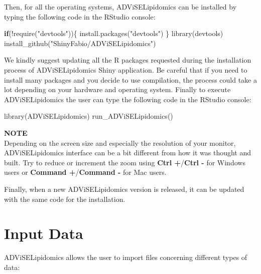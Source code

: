 \documentclass[
]{book}
\newenvironment{Shaded}{\begin{snugshade}}{\end{snugshade}}
\newcommand{\ControlFlowTok}[1]{\textcolor[rgb]{0.13,0.29,0.53}{\textbf{#1}}}
\newcommand{\FunctionTok}[1]{\textcolor[rgb]{0.00,0.00,0.00}{#1}}
\newcommand{\NormalTok}[1]{#1}
\newcommand{\SpecialCharTok}[1]{\textcolor[rgb]{0.00,0.00,0.00}{#1}}
\newcommand{\StringTok}[1]{\textcolor[rgb]{0.31,0.60,0.02}{#1}}
\begin{document}
Then, for all the operating systems, ADViSELipidomics can be installed by typing the following code in the RStudio console:

\begin{Shaded}
\begin{Highlighting}[]
\ControlFlowTok{if}\NormalTok{(}\SpecialCharTok{!}\FunctionTok{require}\NormalTok{(}\StringTok{"devtools"}\NormalTok{))\{}
  \FunctionTok{install.packages}\NormalTok{(}\StringTok{"devtools"}\NormalTok{)}
\NormalTok{\}}
\FunctionTok{library}\NormalTok{(devtools)}
\FunctionTok{install\_github}\NormalTok{(}\StringTok{"ShinyFabio/ADViSELipidomics"}\NormalTok{)}
\end{Highlighting}
\end{Shaded}

We kindly suggest updating all the R packages requested during the installation process of ADViSELipidomics Shiny application. Be careful that if you need to install many packages and you decide to use compilation, the process could take a lot depending on your hardware and operating system.
Finally to execute ADViSELipidomics the user can type the following code in the RStudio console:

\begin{Shaded}
\begin{Highlighting}[]
\FunctionTok{library}\NormalTok{(ADViSELipidomics)}
\FunctionTok{run\_ADViSELipidomics}\NormalTok{()}
\end{Highlighting}
\end{Shaded}

\textbf{NOTE}\\
Depending on the screen size and especially the resolution of your monitor, ADViSELipidomics interface can be a bit different from how it was thought and built. Try to reduce or increment the zoom using \textbf{Ctrl +}/\textbf{Ctrl -} for Windows users or \textbf{Command +}/\textbf{Command -} for Mac users.

Finally, when a new ADViSELipidomics version is released, it can be updated with the same code for the installation.

\hypertarget{inputdata}{%
\chapter{Input Data}\label{inputdata}}

ADViSELipidomics allows the user to import files concerning different types of data:
\end{document}

